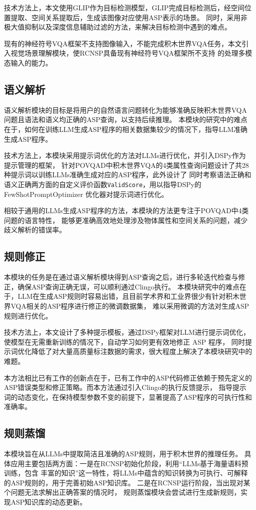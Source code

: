 技术方法上，本文使用GLIP作为目标检测模型，GLIP完成目标检测后，经空间位置提取、空间关系提取后，生成该图像对应使用ASP表示的场景。
同时，采用非极大值抑制以及深度信息辅助过滤的方法，来解决目标检测中遇到的难点。

现有的神经符号VQA框架不支持图像输入，不能完成积木世界VQA任务，本文引入视觉场景理解模块，使RCNSP具备现有神经符号VQA框架所不支持
的处理多模态输入的能力。
\subsection{语义解析}
语义解析模块的目标是将用户的自然语言问题转化为能够准确反映积木世界VQA问题且语法和语义均正确的ASP查询，以支持后续推理。
本模块的研究中的难点在于，如何在训练LLM生成ASP程序的相关数据集较少的情况下，指导LLM准确生成ASP程序。

技术方法上，本模块采用提示词优化的方法对LLMs进行优化，并引入DSPy作为提示管理的框架，
针对POVQAD中积木世界VQA的4类属性查询问题设计了共28种提示词以训练LLMs准确生成对应的ASP程序，此外设计了
同时考察语法正确和语义正确两方面的自定义评价函数\texttt{ValidScore}，用以指导DSPy的 FewShotPromptOptimizer 优化器对提示词进行优化。

相较于通用的LLMs生成ASP程序的方法，本模块的方法更专注于POVQAD中4类问题的语言特性，
能够更准确高效地处理涉及物体属性和空间关系的问题，减少歧义解析的错误率。
\subsection{规则修正}
本模块的任务是在通过语义解析模块得到ASP查询之后，进行多轮迭代检查与修正，确保ASP查询正确无误，可以顺利通过Clingo执行。
本模块研究中的难点在于，LLM在生成ASP规则时容易出错，且目前学术界和工业界很少有针对积木世界VQA相关的ASP程序进行修正的微调数据集，
难以采用微调的方法对生成ASP规则进行优化。

技术方法上，本文设计了多种提示模板，通过DSPy框架对LLM进行提示词优化，使模型在无需重新训练的情况下，自动学习如何更有效地修正 ASP 程序，
同时提示词优化降低了对大量高质量标注数据的需求，很大程度上解决了本模块研究中的难题。

本方法相比已有工作的创新点在于，已有工作中的ASP代码修正依赖于预先定义的ASP错误类型和修正策略。而本方法通过引入Clingo的执行反馈提示，
指导提示词的动态变化，在保持模型参数不变的前提下，显著提高了ASP程序的可执行性和准确率。
\subsection{规则蒸馏}
本模块旨在从LLMs中提取简洁且准确的ASP规则，用于积木世界的推理任务。
具体应用主要包括两方面：一是在RCNSP初始化阶段，利用“LLMs基于海量语料预训练，包含
丰富的知识”这一特性，将LLMs中蕴含的知识转换为可执行、可解释的ASP规则的，用于完善初始ASP知识库。
二是在RCNSP运行阶段，当出现对某个问题无法求解出正确答案的情况时，
规则蒸馏模块会尝试进行生成新规则，实现ASP知识库的动态更新。

